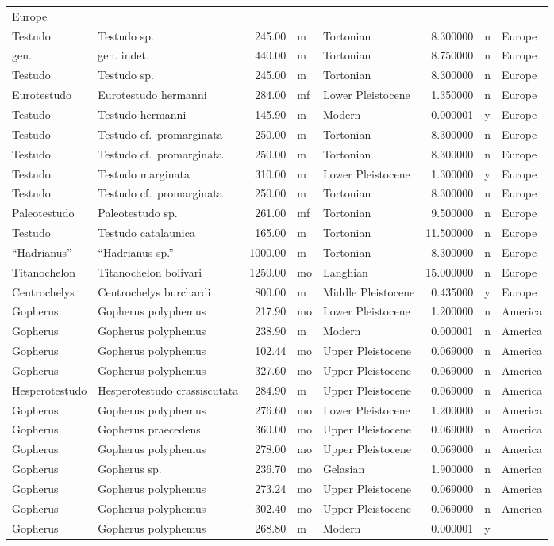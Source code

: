 \begin{landscape}
\begin{longtable}[]{@{}llrllrll@{}}
	Europe\tabularnewline
	Testudo & Testudo sp. & 245.00 & m & Tortonian & 8.300000 & n &
	Europe\tabularnewline
	gen. & gen. indet. & 440.00 & m & Tortonian & 8.750000 & n &
	Europe\tabularnewline
	Testudo & Testudo sp. & 245.00 & m & Tortonian & 8.300000 & n &
	Europe\tabularnewline
	Eurotestudo & Eurotestudo hermanni & 284.00 & mf & Lower Pleistocene &
	1.350000 & n & Europe\tabularnewline
	Testudo & Testudo hermanni & 145.90 & m & Modern & 0.000001 & y &
	Europe\tabularnewline
	Testudo & Testudo cf.~promarginata & 250.00 & m & Tortonian & 8.300000 &
	n & Europe\tabularnewline
	Testudo & Testudo cf.~promarginata & 250.00 & m & Tortonian & 8.300000 &
	n & Europe\tabularnewline
	Testudo & Testudo marginata & 310.00 & m & Lower Pleistocene & 1.300000
	& y & Europe\tabularnewline
	Testudo & Testudo cf.~promarginata & 250.00 & m & Tortonian & 8.300000 &
	n & Europe\tabularnewline
	Paleotestudo & Paleotestudo sp. & 261.00 & mf & Tortonian & 9.500000 & n
	& Europe\tabularnewline
	Testudo & Testudo catalaunica & 165.00 & m & Tortonian & 11.500000 & n &
	Europe\tabularnewline
	``Hadrianus'' & ``Hadrianus sp.'' & 1000.00 & m & Tortonian & 8.300000 &
	n & Europe\tabularnewline
	Titanochelon & Titanochelon bolivari & 1250.00 & mo & Langhian &
	15.000000 & n & Europe\tabularnewline
	Centrochelys & Centrochelys burchardi & 800.00 & m & Middle Pleistocene
	& 0.435000 & y & Europe\tabularnewline
	Gopherus & Gopherus polyphemus & 217.90 & mo & Lower Pleistocene &
	1.200000 & n & America\tabularnewline
	Gopherus & Gopherus polyphemus & 238.90 & m & Modern & 0.000001 & n &
	America\tabularnewline
	Gopherus & Gopherus polyphemus & 102.44 & mo & Upper Pleistocene &
	0.069000 & n & America\tabularnewline
	Gopherus & Gopherus polyphemus & 327.60 & mo & Upper Pleistocene &
	0.069000 & n & America\tabularnewline
	Hesperotestudo & Hesperotestudo crassiscutata & 284.90 & m & Upper
	Pleistocene & 0.069000 & n & America\tabularnewline
	Gopherus & Gopherus polyphemus & 276.60 & mo & Lower Pleistocene &
	1.200000 & n & America\tabularnewline
	Gopherus & Gopherus praecedens & 360.00 & mo & Upper Pleistocene &
	0.069000 & n & America\tabularnewline
	Gopherus & Gopherus polyphemus & 278.00 & mo & Upper Pleistocene &
	0.069000 & n & America\tabularnewline
	Gopherus & Gopherus sp. & 236.70 & mo & Gelasian & 1.900000 & n &
	America\tabularnewline
	Gopherus & Gopherus polyphemus & 273.24 & mo & Upper Pleistocene &
	0.069000 & n & America\tabularnewline
	Gopherus & Gopherus polyphemus & 302.40 & mo & Upper Pleistocene &
	0.069000 & n & America\tabularnewline
	Gopherus & Gopherus polyphemus & 268.80 & m & Modern & 0.000001 & y &

\end{longtable}
\end{landscape}
